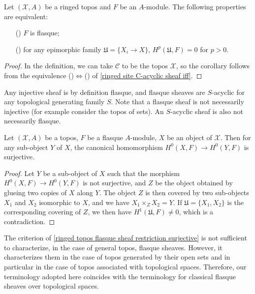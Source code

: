 \begin{corollary}\label{ringed topos flasque sheaf iff Cech for epimorphic}
Let $(\mathcal{X},A)$ be a ringed topos and $F$ be an $A$-module. The following properties are equivalent:
\begin{enumerate}
\item[(\rmnum{1})] $F$ is flasque;
\item[(\rmnum{2})] for any epimorphic family $\mathfrak{U}=\{X_i\to X\}$, $H^p(\mathfrak{U},F)=0$ for $p>0$.
\end{enumerate}
\end{corollary}
\begin{proof}
In the definition, we can take $\mathcal{C}$ to be the topos $\mathcal{X}$, so the corollary follows from the equivalence ()$\Leftrightarrow$() of \cref{ringed site C-acyclic sheaf iff}.
\end{proof}

Any injective sheaf is by definition flasque, and flasque sheaves are $S$-acyclic for any topological generating family $S$. Note that a flasque sheaf is not necessarily injective (for example consider the topos of sets). An $S$-acyclic sheaf is also not necessarily flasque.

\begin{proposition}\label{ringed topos flasque sheaf restriction surjective}
Let $(\mathcal{X},A)$ be a topos, $F$ be a flasque $A$-module, $X$ be an object of $\mathcal{X}$. Then for any sub-object $Y$ of $X$, the canonical homomorphism $H^0(X,F)\to H^0(Y,F)$ is surjective.
\end{proposition}
\begin{proof}
Let $Y$ be a sub-object of $X$ such that the morphism $H^0(X,F)\to H^0(Y,F)$ is not surjective, and $Z$ be the object obtained by glueing two copies of $X$ along $Y$. The object $Z$ is then covered by two sub-objects $X_1$ and $X_2$ isomorphic to $X$, and we have $X_1\times_ZX_2=Y$. If $\mathfrak{U}=\{X_1,X_2\}$ is the corresponding covering of $Z$, we then have $H^1(\mathfrak{U},F)\neq 0$, which is a contradiction.
\end{proof}

The criterion of \cref{ringed topos flasque sheaf restriction surjective} is not sufficient to characterize, in the case of general topos, flasque sheaves. However, it characterizes them in the case of topos generated by their open sets and in particular in the case of topos associated with topological spaces. Therefore, our terminology adopted here coincides with the terminology for classical flasque sheaves over topological spaces.

